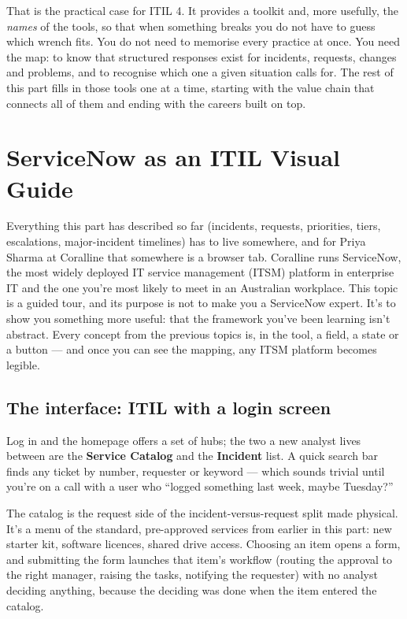 That is the practical case for ITIL 4. It provides a toolkit and, more usefully, the \emph{names} of the tools, so that when something breaks you do not have to guess which wrench fits. You do not need to memorise every practice at once. You need the map: to know that structured responses exist for incidents, requests, changes and problems, and to recognise which one a given situation calls for. The rest of this part fills in those tools one at a time, starting with the value chain that connects all of them and ending with the careers built on top.

\section{ServiceNow as an ITIL Visual Guide}
Everything this part has described so far (incidents, requests, priorities, tiers, escalations, major-incident timelines) has to live somewhere, and for Priya Sharma at Coralline that somewhere is a browser tab. Coralline runs ServiceNow, the most widely deployed IT service management (ITSM) platform in enterprise IT and the one you're most likely to meet in an Australian workplace. This topic is a guided tour, and its purpose is not to make you a ServiceNow expert. It's to show you something more useful: that the framework you've been learning isn't abstract. Every concept from the previous topics is, in the tool, a field, a state or a button — and once you can see the mapping, any ITSM platform becomes legible.



\subsection{The interface: ITIL with a login screen}


Log in and the homepage offers a set of hubs; the two a new analyst lives between are the \textbf{Service Catalog} and the \textbf{Incident} list. A quick search bar finds any ticket by number, requester or keyword — which sounds trivial until you're on a call with a user who ``logged something last week, maybe Tuesday?''


The catalog is the request side of the incident-versus-request split made physical. It's a menu of the standard, pre-approved services from earlier in this part: new starter kit, software licences, shared drive access. Choosing an item opens a form, and submitting the form launches that item's workflow (routing the approval to the right manager, raising the tasks, notifying the requester) with no analyst deciding anything, because the deciding was done when the item entered the catalog.


